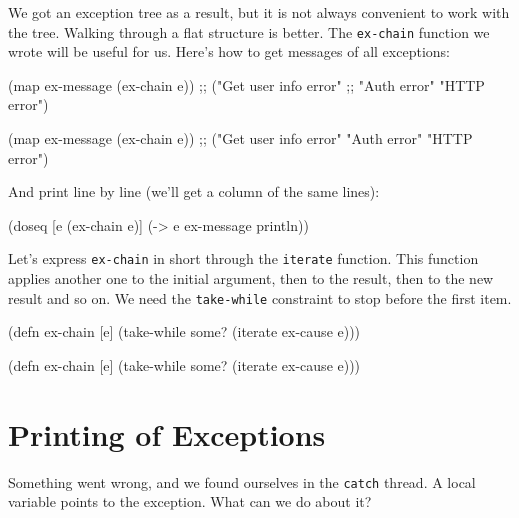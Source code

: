 \fi


We got an exception tree as a result, but it is not always convenient to work with the tree. Walking through a flat structure is better. The \verb|ex-chain| function we wrote will be useful for us. Here's how to get messages of all exceptions:

\ifnarrow

\begin{clojure}
(map ex-message (ex-chain e))
;; ("Get user info error"
;;  "Auth error" "HTTP error")
\end{clojure}

\else

\begin{clojure}
(map ex-message (ex-chain e))
;; ("Get user info error" "Auth error" "HTTP error")
\end{clojure}

\fi

\noindent
And print line by line (we'll get a column of the same lines):


\begin{clojure}
(doseq [e (ex-chain e)]
  (-> e ex-message println))
\end{clojure}

Let's express \verb|ex-chain| in short through the \verb|iterate| function. This function applies another one to the initial argument, then to the result, then to the new result and so on. We need the \verb|take-while| constraint to stop before the first  item.

\ifnarrow

\begin{clojure}
(defn ex-chain [e]
  (take-while some?
    (iterate ex-cause e)))
\end{clojure}

\else

\begin{clojure}
(defn ex-chain [e]
  (take-while some? (iterate ex-cause e)))
\end{clojure}

\fi

\section{Printing of Exceptions}

Something went wrong, and we found ourselves in the \verb|catch| thread. A local variable points to the exception. What can we do about it?


